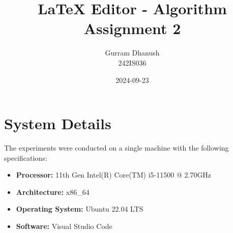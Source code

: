 \documentclass{article}
\begin{document}
\title{LaTeX Editor - Algorithm Assignment 2}
\author{Gurram Dhanush \\ 242IS036}
\date{2024-09-23}
\maketitle

\section{System Details}
The experiments were conducted on a single machine with the following specifications:
\begin{itemize}
    \item \textbf{Processor:} 11th Gen Intel(R) Core(TM) i5-11500 @ 2.70GHz
    \item \textbf{Architecture:} x86\_64
    \item \textbf{Operating System:} Ubuntu 22.04 LTS
    \item \textbf{Software:} Visual Studio Code
\end{itemize}
\end{document}
